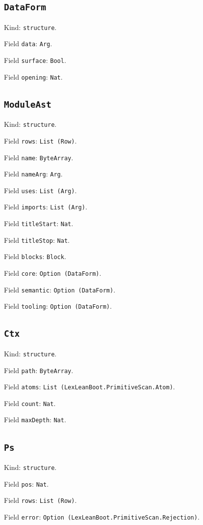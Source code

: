 \documentclass[11pt]{article}
\begin{document}
\subsection*{\texttt{DataForm}}
\noindent Kind: \texttt{structure}.\par
\noindent Field \texttt{data}: \texttt{Arg}.\par
\noindent Field \texttt{surface}: \texttt{Bool}.\par
\noindent Field \texttt{opening}: \texttt{Nat}.\par
\subsection*{\texttt{ModuleAst}}
\noindent Kind: \texttt{structure}.\par
\noindent Field \texttt{rows}: \texttt{List (Row)}.\par
\noindent Field \texttt{name}: \texttt{ByteArray}.\par
\noindent Field \texttt{nameArg}: \texttt{Arg}.\par
\noindent Field \texttt{uses}: \texttt{List (Arg)}.\par
\noindent Field \texttt{imports}: \texttt{List (Arg)}.\par
\noindent Field \texttt{titleStart}: \texttt{Nat}.\par
\noindent Field \texttt{titleStop}: \texttt{Nat}.\par
\noindent Field \texttt{blocks}: \texttt{Block}.\par
\noindent Field \texttt{core}: \texttt{Option (DataForm)}.\par
\noindent Field \texttt{semantic}: \texttt{Option (DataForm)}.\par
\noindent Field \texttt{tooling}: \texttt{Option (DataForm)}.\par
\subsection*{\texttt{Ctx}}
\noindent Kind: \texttt{structure}.\par
\noindent Field \texttt{path}: \texttt{ByteArray}.\par
\noindent Field \texttt{atoms}: \texttt{List (LexLeanBoot.PrimitiveScan.Atom)}.\par
\noindent Field \texttt{count}: \texttt{Nat}.\par
\noindent Field \texttt{maxDepth}: \texttt{Nat}.\par
\subsection*{\texttt{Ps}}
\noindent Kind: \texttt{structure}.\par
\noindent Field \texttt{pos}: \texttt{Nat}.\par
\noindent Field \texttt{rows}: \texttt{List (Row)}.\par
\noindent Field \texttt{error}: \texttt{Option (LexLeanBoot.PrimitiveScan.Rejection)}.\par
\end{document}
